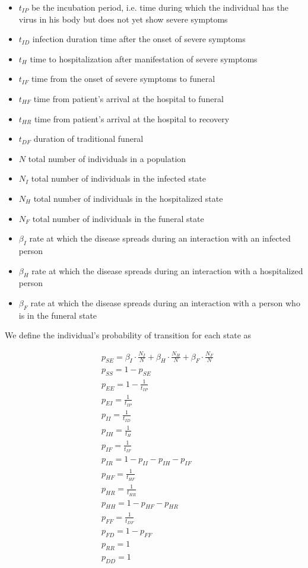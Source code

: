 \documentclass[10pt]{article}
\begin{document}
\begin{itemize}
\item[]$t_{IP}$ be the incubation period, i.e. time during which the individual has the virus in his body but does not yet show severe symptoms
\item[] $t_{ID}$ infection duration time after the onset of severe symptoms
\item[] $t_{H}$ time to hospitalization after manifestation of severe symptoms
\item[] $t_{IF}$ time from the onset of severe symptoms to funeral
\item[] $t_{HF}$ time from patient's arrival at the hospital to funeral
\item[] $t_{HR}$ time from patient's arrival at the hospital to recovery
\item[] $t_{DF}$ duration of traditional funeral
\item[] $N$  total number of individuals in a population
\item[] $N_{I}$  total number of individuals in the infected state
\item[] $N_{H}$  total number of individuals in the hospitalized state
\item[] $N_{F}$  total number of individuals in the funeral state
\item[] $\beta_{I}$ rate at which the disease spreads during an interaction with an infected person
\item[] $\beta_{H}$ rate at which the disease spreads during an interaction with a hospitalized person
\item[] $\beta_{F}$ rate at which the disease spreads during an interaction with a person who is in the funeral state
\end{itemize}
We define the individual's probability of transition for each state as

\begin{subequations}
\begin{alignat}{1}
&p_{SE}=\beta_I\cdot \frac{N_{I}}{N}+\beta_H\cdot \frac{N_{H}}{N}+\beta_F\cdot\frac{ N_F}{N}\\
&p_{SS}=1-p_{SE}\\
&p_{EE}=1-\frac{1}{t_{IP}}\\
&p_{EI}=\frac{1}{t_{IP}}\\
&p_{II}=\frac{1}{t_{ID}}\\
&p_{IH}=\frac{1}{t_{H}}\\
&p_{IF}= \frac{1}{t_{IF}}\\
&p_{IR}=1-p_{II}-p_{IH}-p_{IF}\\
&p_{HF}=\frac{1}{t_{HF}}\\
&p_{HR}=\frac{1}{t_{HR}}\\
&p_{HH}=1-p_{HF}-p_{HR}\\
&p_{FF}=\frac{1}{t_{DF}}\\
&p_{FD}=1-p_{FF}\\
&p_{RR}=1\\
&p_{DD}=1
\end{alignat}
\end{subequations}
\end{document}
